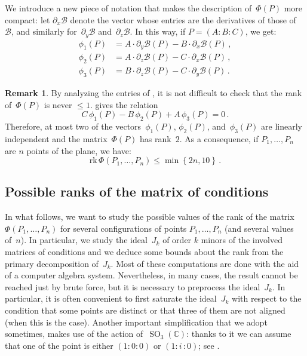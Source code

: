\documentclass[a4paper, 11pt, reqno]{amsart}
\theoremstyle{plain}
\theoremstyle{definition}
\newtheorem{rmk}[lemma]{Remark}
\newcommand{\C}{\mathbb{C}}
\newcommand{\de}{\partial}
\newcommand{\iii}{\textit{i}\,}
\newcommand{\rk}{\ensuremath{\mathrm{rk}}}
\newcommand{\SO}{\operatorname{SO}}
\begin{document}
We introduce a new piece of notation that makes the description of~$\Phi(P)$ more compact: let $\de_x \mathcal{B}$ denote the vector whose entries are the derivatives of those of~$\mathcal{B}$, and similarly for~$\de_y \mathcal{B}$ and~$\de_z \mathcal{B}$.
In this way, if $P=(A: B: C)$, we get:
%
\begin{equation}
\label{equation:vector_conditions}
  \begin{aligned}
    \phi_1(P) &= A\cdot \de_y \mathcal{B}(P) - B\cdot \de_x \mathcal{B}(P) \,, \\
    \phi_2(P) &= A\cdot \de_z \mathcal{B}(P) - C\cdot \de_x \mathcal{B}(P) \,, \\
    \phi_3(P) &= B\cdot \de_z \mathcal{B}(P) - C\cdot \de_y \mathcal{B}(P) \,.
  \end{aligned}
\end{equation}
%
\begin{rmk}
By analyzing the entries of , it is not difficult to check that the rank of~$\Phi(P)$ is never $\leq 1$.  gives the relation
%
\begin{equation}
\label{eq:syzygy}
  C \, \phi_1(P) - B \, \phi_2(P) + A \, \phi_3(P) = 0 \,.
\end{equation}
%
Therefore, at most two of the vectors~$\phi_1(P)$, $\phi_2(P)$, and~$\phi_3(P)$ are linearly independent and the matrix~$\Phi(P)$ has rank~$2$.
As a consequence, if $P_1, \dots, P_n$ are $n$ points of the plane, we have:
%
\[
  \rk \,\Phi(P_1, \dots, P_n) \leq \min \left\{2n, 10 \right\} \,.
\]
%
\end{rmk}

\subsection{Possible ranks of the matrix of conditions}

In what follows, we want to study the possible values of the rank of the matrix
$\Phi(P_1, \dots, P_n)$ for several configurations of points $P_1, \dots, P_n$
(and several values of~$n$).
In particular, we study the ideal~$J_k$ of order $k$ minors of the
involved matrices of conditions and we deduce some bounds about the rank from the primary
decomposition of~$J_k$. 
Most of these computations are done with the aid of a computer algebra system.
Nevertheless, in many cases, the result cannot be reached just by brute force, 
but it is necessary to preprocess the ideal~$J_k$. 
In particular, it is often convenient to first saturate the ideal~$J_k$ with respect to
the condition that some points are distinct or that three of them are not aligned 
(when this is the case). 
Another important simplification that we adopt sometimes, makes use
of the action of~$\SO_3(\C)$: thanks to it we can assume that one of
the point is either $(1: 0: 0)$ or $(1: \iii: 0)$; see .
\end{document}
